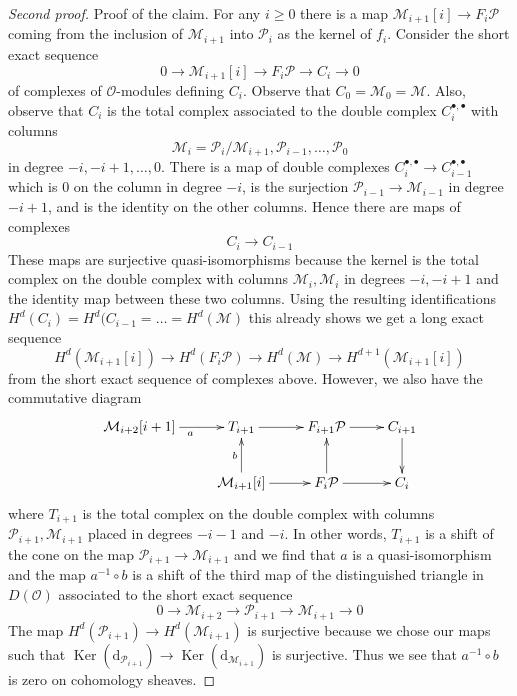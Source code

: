 \documentclass{stacks-project}
\theoremstyle{plain}
\theoremstyle{definition}
\theoremstyle{remark}
\numberwithin{equation}{subsection}
\def\Ker{\mathop{\mathrm{Ker}}}
\begin{document}
\begin{proof}[Second proof]
\medskip\noindent
Proof of the claim. For any $i \geq 0$ there is a map
$\mathcal{M}_{i + 1}[i] \to F_i\mathcal{P}$ coming from
the inclusion of $\mathcal{M}_{i + 1}$ into $\mathcal{P}_i$
as the kernel of $f_i$. Consider the short exact sequence
$$
0 \to \mathcal{M}_{i + 1}[i] \to F_i\mathcal{P} \to C_i \to 0
$$
of complexes of $\mathcal{O}$-modules defining $C_i$.
Observe that $C_0 = \mathcal{M}_0 = \mathcal{M}$.
Also, observe that $C_i$ is the total complex associated to the
double complex $C_i^{\bullet, \bullet}$ with columns
$$
\mathcal{M}_i = \mathcal{P}_i/\mathcal{M}_{i + 1},
\mathcal{P}_{i - 1}, \ldots, \mathcal{P}_0
$$
in degree $-i, -i + 1, \ldots, 0$. There is a map of double complexes
$C_i^{\bullet, \bullet} \to C_{i - 1}^{\bullet, \bullet}$ which is
$0$ on the column in degree $-i$, is the surjection
$\mathcal{P}_{i - 1} \to \mathcal{M}_{i - 1}$ in degree $-i + 1$,
and is the identity on the other columns.
Hence there are maps of complexes
$$
C_i \longrightarrow C_{i - 1}
$$
These maps are surjective quasi-isomorphisms because the kernel
is the total complex on the double complex with columns
$\mathcal{M}_i, \mathcal{M}_i$ in degrees $-i, -i + 1$ and
the identity map between these two columns. Using the
resulting identifications
$H^d(C_i) = H^d(C_{i - 1} = \ldots = H^d(\mathcal{M})$
this already shows we get a long exact sequence
$$
H^d(\mathcal{M}_{i + 1}[i]) \to
H^d(F_i\mathcal{P}) \to H^d(\mathcal{M}) \to
H^{d + 1}(\mathcal{M}_{i + 1}[i])
$$
from the short exact sequence of complexes above.
However, we also have the commutative diagram
$$
\xymatrix{
\mathcal{M}_{i + 2}[i + 1] \ar[r]_a & T_{i + 1} \ar[r] &
F_{i + 1}\mathcal{P} \ar[r] & C_{i + 1} \ar[d] \\
& \mathcal{M}_{i + 1}[i] \ar[r] \ar[u]^b &
F_i\mathcal{P} \ar[u] \ar[r] &
C_i
}
$$
where $T_{i + 1}$ is the total complex on the double complex
with columns $\mathcal{P}_{i + 1}, \mathcal{M}_{i + 1}$ placed
in degrees $-i - 1$ and $-i$. In other words, $T_{i + 1}$ is
a shift of the cone on the map
$\mathcal{P}_{i + 1} \to \mathcal{M}_{i + 1}$ and we find that
$a$ is a quasi-isomorphism and the map $a^{-1} \circ b$ is a shift of the
third map of the distinguished triangle in $D(\mathcal{O})$ associated
to the short exact sequence
$$
0 \to \mathcal{M}_{i + 2} \to \mathcal{P}_{i + 1} \to \mathcal{M}_{i + 1} \to 0
$$
The map $H^d(\mathcal{P}_{i + 1}) \to H^d(\mathcal{M}_{i + 1})$
is surjective because we chose our maps such that
$\Ker(\text{d}_{\mathcal{P}_{i + 1}}) \to
\Ker(\text{d}_{\mathcal{M}_{i + 1}})$ is surjective.
Thus we see that $a^{-1} \circ b$ is zero on cohomology sheaves.

\end{proof}
\end{document}
